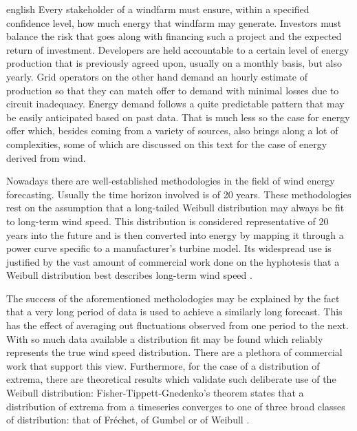 \documentclass[
	12pt,				%
	openright,			%
	oneside,			%
	a4paper,			%
	english,			%
	french,				%
	spanish,			%
	brazil				%
	]{abntex2}
\begin{document}
\begin{resumo}[Abstract]
 \begin{otherlanguage*}{english}
	Every stakeholder of a windfarm must ensure, within a specified confidence level, how much energy that windfarm may generate. Investors must balance the risk that goes along with financing such a project and the expected return of investment. Developers are held accountable to a certain level of energy production that is previously agreed upon, usually on a monthly basis, but also yearly. Grid operators on the other hand demand an hourly estimate of production so that they can match offer to demand with minimal losses due to circuit inadequacy. Energy demand follows a quite predictable pattern that may be easily anticipated based on past data. That is much less so the case for energy offer which, besides coming from a variety of sources, also brings along a lot of complexities, some of which are discussed on this text for the case of energy derived from wind.
	
	Nowadays there are well-established methodologies in the field of wind energy forecasting. Usually the time horizon involved is of 20 years. These methodologies rest on the assumption that a long-tailed Weibull distribution \cite{weibull} may always be fit to long-term wind speed. This distribution is considered representative of 20 years into the future and is then converted into energy \cite{art15} by mapping it through a power curve specific to a manufacturer's turbine model. 
Its widespread use is justified by the vast amount of commercial work done on the hyphotesis that a Weibull distribution best describes long-term wind speed \cite{art14}. 

	The success of the aforementioned metholodogies may be explained by the fact that a very long period of data is used to achieve a similarly long forecast. This has the effect of averaging out fluctuations observed from one period to the next. With so much data available a distribution fit may be found which reliably represents the true wind speed distribution. There are a plethora of commercial work that support this view. Furthermore, for the case of a distribution of extrema, there are theoretical results which validate such deliberate use of the Weibull distribution: Fisher-Tippett-Gnedenko's theorem states that a distribution of extrema from a timeseries converges to one of three broad classes of distribution: that of Fréchet, of Gumbel or of Weibull \cite{Basrak2011}. 	
	

\end{otherlanguage*}
\end{resumo}
\end{document}
